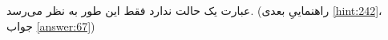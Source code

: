 \section{}
\paragraph{}\label{hint:274}
عبارت  یک حالت  ندارد فقط این طور به نظر می‌رسد. (راهنماییِ بعدی \ref{hint:242}، جواب \ref{answer:67})